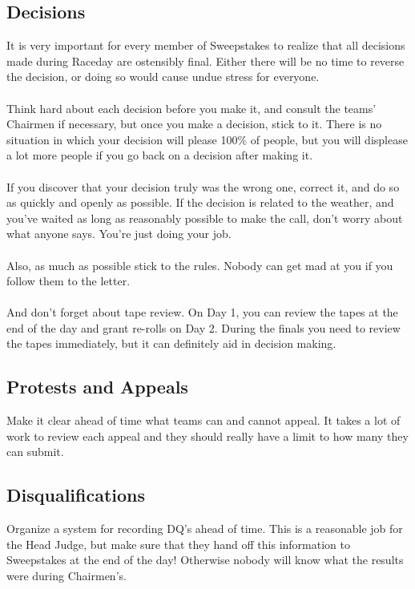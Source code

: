 \subsection{Decisions}
It is very important for every member of Sweepstakes to realize that all
decisions made during Raceday are ostensibly final. Either there will be
no time to reverse the decision, or doing so would cause undue stress for
everyone.
\\\\
Think hard about each decision before you make it, and consult the teams'
Chairmen if necessary, but once you make a decision, stick to it. There is no
situation in which your decision will please 100\% of people, but you will
displease a lot more people if you go back on a decision after making it.
\\\\
If you discover that your decision truly was the wrong one, correct it,
and do so as quickly and openly as possible. If the decision is related to
the weather, and you've waited as long as reasonably possible to make the call,
don't worry about what anyone says. You're just doing your job.
\\\\
Also, as much as possible stick to the rules. Nobody can get mad at you
if you follow them to the letter.
\\\\
And don't forget about tape review. On Day 1, you can review the tapes at the
end of the day and grant re-rolls on Day 2. During the finals you need to
review the tapes immediately, but it can definitely aid in decision making.

\subsection{Protests and Appeals}
Make it clear ahead of time what teams can and cannot appeal. It takes a
lot of work to review each appeal and they should really have a limit
to how many they can submit.

\subsection{Disqualifications}
Organize a system for recording DQ's ahead of time. This is a reasonable
job for the Head Judge, but make sure that they hand off this information
to Sweepstakes at the end of the day! Otherwise nobody will know what the
results were during Chairmen's.

